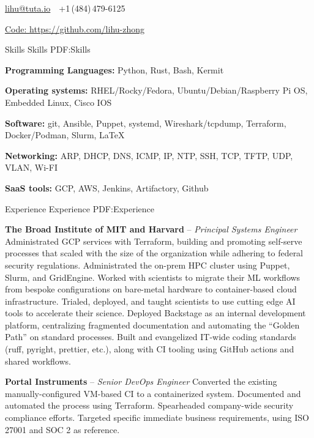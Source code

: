 \documentclass[letterpaper,MMMyyyy,nonstopmode]{simpleresumecv}
\newcommand{\CVAuthor}{Lihu Zhong}
\begin{document}
\Title{\CVAuthor}

\begin{SubTitle}
\href{mailto:lihu@tuta.io}
{lihu@tuta.io}
\,\SubBulletSymbol\,
+1\,(484)\,479-6125
\par
\href{https://github.com/lihu-zhong}
{Code: \url{https://github.com/lihu-zhong}}
\end{SubTitle}

\begin{Body}

\Section
{Skills}
{Skills}
{PDF:Skills}
{\raggedright

\Entry
\textbf{Programming Languages: }
Python,
Rust,
Bash,
Kermit

\Entry
\textbf{Operating systems:}
RHEL/Rocky/Fedora,
Ubuntu/Debian/Raspberry Pi OS,
Embedded Linux,
Cisco IOS

\Entry
\textbf{Software: }
git,
Ansible,
Puppet,
systemd,
Wireshark/tcpdump,
Terraform,
Docker/Podman,
Slurm,
{\LaTeX}

\Entry
\textbf{Networking: }
ARP,
DHCP,
DNS,
ICMP,
IP,
NTP,
SSH,
TCP,
TFTP,
UDP,
VLAN,
Wi-FI

\Entry
\textbf{SaaS tools: }
GCP,
AWS,
Jenkins,
Artifactory,
Github

}

\Section
{Experience}
{Experience}
{PDF:Experience}

\Entry
\textbf{The Broad Institute of MIT and Harvard}
\hfill
{} --
\Gap
\textit{Principal Systems Engineer}
\Gap
\BulletItem
Administrated GCP services with Terraform, building and promoting self-serve
processes that scaled with the size of the organization while adhering to
federal security regulations.
\BulletItem
Administrated the on-prem HPC cluster using Puppet, Slurm, and GridEngine.
\BulletItem
Worked with scientists to migrate their ML workflows from bespoke configurations
on bare-metal hardware to container-based cloud infrastructure.
\BulletItem
Trialed, deployed, and taught scientists to use cutting edge AI tools to
accelerate their science.
\BulletItem
Deployed Backstage as an internal development platform, centralizing fragmented
documentation and automating the ``Golden Path'' on standard processes.
\BulletItem
Built and evangelized IT-wide coding standards (ruff, pyright, prettier,
etc.), along with CI tooling using GitHub actions and shared workflows.

\BigGap

\Entry
\textbf{Portal Instruments}
\hfill
{} --
\Gap
\textit{Senior DevOps Engineer}
\Gap
\BulletItem
Converted the existing manually-configured VM-based CI to a containerized
system. Documented and automated the process using Terraform.
\BulletItem
Spearheaded company-wide security compliance efforts. Targeted specific
immediate business requirements, using ISO 27001 and SOC 2 as reference.


\end{Body}
\end{document}
